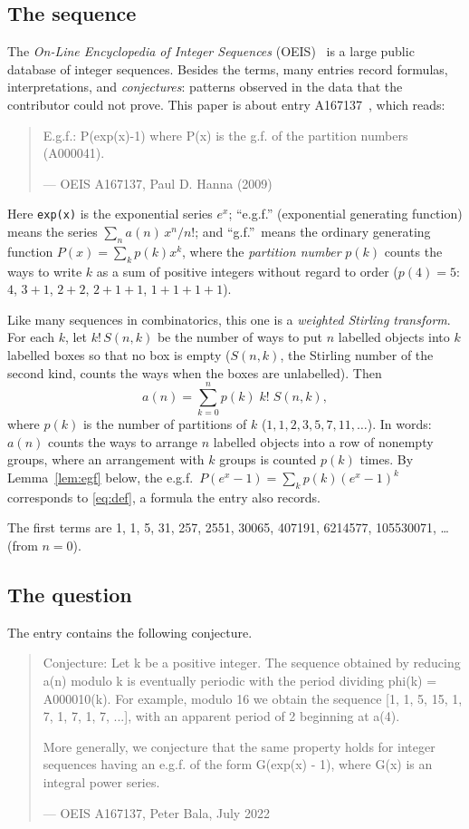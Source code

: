 \documentclass[11pt,a4paper]{article}
\theoremstyle{definition}
\theoremstyle{remark}
\begin{document}
\subsection{The sequence}\label{sec:sequence}
The \emph{On-Line Encyclopedia of Integer Sequences} (OEIS)~\cite{oeisdb} is a large public database of integer sequences.
Besides the terms, many entries record formulas, interpretations, and \emph{conjectures}: patterns observed in the data
that the contributor could not prove. This paper is about entry A167137~\cite{oeis}, which reads:
\begin{quote}\small\ttfamily\raggedright E.g.f.: P(exp(x)-1) where P(x) is the g.f. of the partition numbers (A000041).\par\smallskip\hfill\textrm{--- OEIS A167137, Paul D. Hanna (2009)}\end{quote}

Here \texttt{exp(x)} is the exponential series $e^x$; ``e.g.f.'' (exponential generating function) means the
series $\sum_na(n)\,x^n/n!$; and ``g.f.''\ means the ordinary generating function $P(x)=\sum_kp(k)x^k$, where the
\emph{partition number} $p(k)$ counts the ways to write $k$ as a sum of positive integers without regard to order
($p(4)=5$: $4$, $3+1$, $2+2$, $2+1+1$, $1+1+1+1$).

Like many sequences in combinatorics, this one is a \emph{weighted Stirling transform}. For each $k$, let
$k!\,S(n,k)$ be the number of ways to put $n$ labelled objects into $k$ labelled boxes so that no box is empty
($S(n,k)$, the Stirling number of the second kind, counts the ways when the boxes are unlabelled). Then
\begin{equation}\label{eq:def}
a(n)=\sum_{k=0}^{n}p(k)\;k!\;S(n,k),
\end{equation}
where $p(k)$ is the number of partitions of $k$ ($1,1,2,3,5,7,11,\dots$). In words: $a(n)$ counts the ways to arrange $n$ labelled objects into a row of
nonempty groups, where an arrangement with $k$ groups is counted $p(k)$ times. By Lemma~\ref{lem:egf} below, the e.g.f.\ $P(e^x-1)=\sum_kp(k)(e^x-1)^k$ corresponds to
\eqref{eq:def}, a formula the entry also records.

The first terms are 1, 1, 5, 31, 257, 2551, 30065, 407191, 6214577, 105530071, \dots{} (from $n=0$).

\subsection{The question}
The entry contains the following conjecture.
\begin{quote}\small\ttfamily\raggedright Conjecture: Let k be a positive integer. The sequence obtained by reducing a(n) modulo k is eventually periodic with the period dividing phi(k) = A000010(k). For example, modulo 16 we obtain the sequence [1, 1, 5, 15, 1, 7, 1, 7, 1, 7, ...], with an apparent period of 2 beginning at a(4).\par\smallskip More generally, we conjecture that the same property holds for integer sequences having an e.g.f. of the form G(exp(x) - 1), where G(x) is an integral power series.\par\smallskip\hfill\textrm{--- OEIS A167137, Peter Bala, July 2022}\end{quote}
\end{document}
